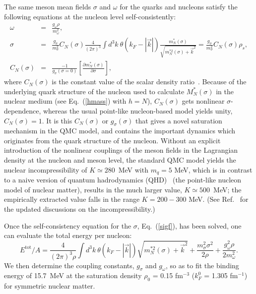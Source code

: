\documentclass[preprint,aps,showpacs,floatfix]{revtex4}
\begin{document}
The same meson mean fields $\sigma$ and $\omega$ for the quarks and nucleons satisfy
the following equations at the nucleon level self-consistently:
%
\begin{eqnarray}
{\omega}&=&\frac{g_\omega \rho}{m_\omega^2},
\label{omgf}\\
%
{\sigma}&=&\frac{g_\sigma }{m_\sigma^2}C_N({\sigma})
\frac{4}{(2\pi)^3}\int d^3 k \ \theta (k_F - |\vec{k}|)
\frac{m_N^*(\sigma)}{\sqrt{m_N^{* 2}(\sigma)+\vec{k}^2}} 
= \frac{g_\sigma }{m_\sigma^2}C_N({\sigma}) \rho_s,
\label{sigf}\\
C_N(\sigma) &=& \frac{-1}{g_\sigma(\sigma=0)}
\left[ \frac{\partial m^*_N(\sigma)}{\partial\sigma} \right],
\label{CN}
\end{eqnarray}
%
where $C_N(\sigma)$ is the constant value of the scalar density ratio~\cite{Guichon,QMCfinite,QMCreview}.
Because of the underlying quark structure of the nucleon used to calculate
$M^*_N(\sigma)$ in the nuclear medium (see Eq.~(\ref{hmass}) with $h=N$),
$C_N(\sigma)$ gets nonlinear $\sigma$-dependence,
whereas the usual point-like nucleon-based model yields unity, $C_N(\sigma) = 1$.
It is this $C_N(\sigma)$ or $g_\sigma (\sigma)$ that gives a novel saturation mechanism
in the QMC model, and contains the important dynamics which originates from the quark structure
of the nucleon. Without an explicit introduction of the nonlinear
couplings of the meson fields in the Lagrangian density at the nucleon and meson level,
the standard QMC model yields the nuclear incompressibility of $K \simeq 280$~MeV with 
$m_q=5$ MeV, which is in contrast to a naive version of quantum hadrodynamics (QHD)~\cite{QHD}
(the point-like nucleon model of nuclear matter),
results in the much larger value, $K \simeq 500$~MeV;
the empirically extracted value falls in the range $K = 200 - 300$ MeV.
(See Ref.~\cite{Stone} for the updated discussions on the incompressibility.)


Once the self-consistency equation for the ${\sigma}$, Eq.~(\ref{sigf}), 
has been solved, one can evaluate the total energy per nucleon:
%
\begin{equation}
E^\mathrm{tot}/A=\frac{4}{(2\pi)^3 \rho}\int d^3 k \
\theta (k_F - |\vec{k}|) \sqrt{m_N^{* 2}(\sigma)+
\vec{k}^2}+\frac{m_\sigma^2 {\sigma}^2}{2 \rho}+
\frac{g_\omega^2\rho}{2m_\omega^2} .
\label{toten}
\end{equation}
%
We then determine the coupling constants, $g_{\sigma}$ and $g_{\omega}$, so as
to fit the binding energy of 15.7~MeV at the saturation density $\rho_0$ = 0.15 fm$^{-3}$
($k_F^0$ = 1.305 fm$^{-1}$) for symmetric nuclear matter.
\end{document}
